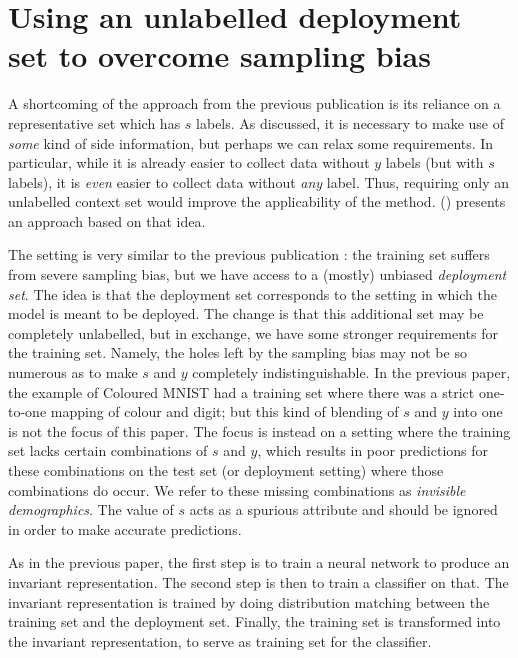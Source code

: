 \section{Using an unlabelled deployment set to overcome sam\-p\-ling bias}\label{sec:zsf}
A shortcoming of the approach from the previous publication \citep{kehrenberg2020nullsampling}
is its reliance on a representative set which has \(s\) labels.
As discussed, it is necessary to make use of \emph{some} kind of side information,
but perhaps we can relax some requirements.
In particular, while it is already easier to collect data without \(y\) labels (but with \(s\) labels),
it is \emph{even} easier to collect data without \emph{any} label.
Thus, requiring only an unlabelled context set would improve the applicability of the method.
\citet{kehrenberg2020zeroshot} () presents an approach based on that idea.

The setting is very similar to the previous publication \citep{kehrenberg2020nullsampling}:
the training set suffers from severe sampling bias, but we have access to a (mostly) unbiased \emph{deployment set}.
The idea is that the deployment set corresponds to the setting in which the model is meant to be deployed.
The change is that this additional set may be completely unlabelled,
but in exchange, we have some stronger requirements for the training set.
Namely, the holes left by the sampling bias may not be so numerous
as to make \(s\) and \(y\) completely indistinguishable.
In the previous paper, the example of Coloured MNIST had a training set
where there was a strict one-to-one mapping of colour and digit;
but this kind of blending of \(s\) and \(y\) into one is not the focus of this paper.
The focus is instead on a setting where the training set lacks certain combinations of \(s\) and \(y\),
which results in poor predictions for these combinations on the test set (or deployment setting)
where those combinations do occur.
We refer to these missing combinations as \emph{invisible demographics}.
The value of \(s\) acts as a spurious attribute and should be ignored in order to make accurate predictions.

As in the previous paper, the first step is to train a neural network to produce an invariant representation.
The second step is then to train a classifier on that.
The invariant representation is trained by doing distribution matching between the training set and the deployment set.
Finally, the training set is transformed into the invariant representation,
to serve as training set for the classifier.

